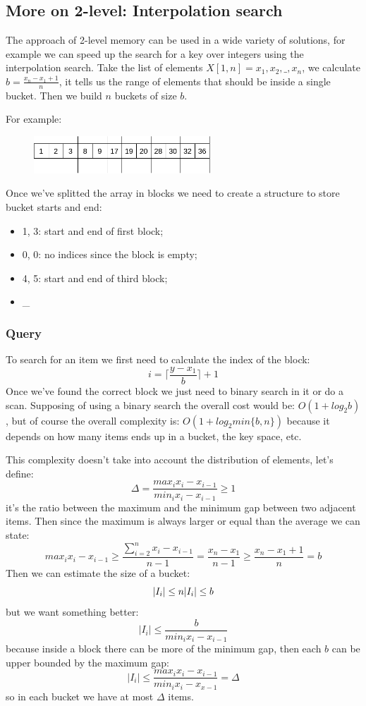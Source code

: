 \subsection{More on 2-level: Interpolation search}
The approach of 2-level memory can be used in a wide variety of solutions, for example we can speed up the search for a key over integers using the interpolation search.
Take the list of elements $X[1, n] = x_1, x_2, \_, x_n$, we calculate $b = \frac{x_n - x_1 + 1}{n}$, it tells us the range of elements that should be inside a single bucket.
Then we build $n$ buckets of size $b$.

For example:
\begin{figure}[H]
    \centering
    \includegraphics[width=250px]{images/6_Set_intersection/interpolation_search.png}
\end{figure}
Once we've splitted the array in blocks we need to create a structure to store bucket starts and end:
\begin{itemize}
    \item 1, 3: start and end of first block;
    \item 0, 0: no indices since the block is empty;
    \item 4, 5: start and end of third block;
    \item \_
\end{itemize}

\subsubsection{Query}
To search for an item we first need to calculate the index of the block:
$$
    i = \lceil \frac{y - x_1}{b} \rceil + 1
$$
Once we've found the correct block we just need to binary search in it or do a scan.
Supposing of using a binary search the overall cost would be: $O(1 + log_2 b)$, but of course the overall complexity is: $O(1 + log_2 min\{b, n\})$ because it depends on how many items ends up in a bucket, the key space, etc.

This complexity doesn't take into account the distribution of elements, let's define:
$$
    \Delta = \frac{max_i x_i - x_{i-1}}{min_i x_i - x_{i-1}} \geq 1
$$
it's the ratio between the maximum and the minimum gap between two adjacent items.
Then since the maximum is always larger or equal than the average we can state:
$$
    max_i x_i - x_{i-1} \geq \frac{ \sum_{i=2}^n x_i - x_{i-1} }{ n-1 } = \frac{x_n - x_1}{n-1} \geq \frac{x_n - x_1 +1}{n} = b
$$
Then we can estimate the size of a bucket:
$$
    |I_i| \leq n \\
    |I_i| \leq b
$$
but we want something better:
$$
    |I_i| \leq \frac{b}{min_i x_i - x_{i-1}}
$$
because inside a block there can be more of the minimum gap, then each $b$ can be upper bounded by the maximum gap:
$$
    |I_i| \leq \frac{ max_i x_i - x_{i-1} }{ min_i x_i - x_{x-1} } = \Delta
$$
so in each bucket we have at most $\Delta$ items.

